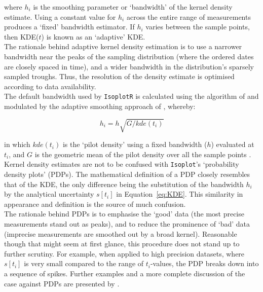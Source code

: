 \documentclass{article}
\begin{document}
\noindent where $h_i$ is the smoothing parameter or `bandwidth' of the
kernel density estimate. Using a constant value for $h_i$ across the
entire range of measurements produces a `fixed' bandwidth estimator.
If $h_i$ varies between the sample points, then KDE($t$) is known as
an `adaptive' KDE.\\

The rationale behind adaptive kernel density estimation is to use a
narrower bandwidth near the peaks of the sampling distribution (where
the ordered dates are closely spaced in time), and a wider bandwidth
in the distribution's sparsely sampled troughs. Thus, the resolution
of the density estimate is optimised according to data
availability.\\

The default bandwidth used by \texttt{IsoplotR} is calculated using
the algorithm of \citet{botev2010} and modulated by the adaptive
smoothing approach of \citet{abramson1982}, whereby:

\begin{equation*}
  h_i = h \sqrt{G/kde(t_i)}
  \label{eq:Abramson}
\end{equation*}

\noindent in which $kde(t_i)$ is the `pilot density' using a fixed
bandwidth ($h$) evaluated at $t_i$, and $G$ is the geometric mean of
the pilot density over all the sample points \citep{kerm2003}.\\

Kernel density estimates are not to be confused with
\texttt{Isoplot}'s `probability density plots' (PDPs). The
mathematical definition of a PDP closely resembles that of the KDE,
the only difference being the substitution of the bandwidth $h_i$ by
the analytical uncertainty $s[t_i]$ in Equation~\ref{eq:KDE}. This
similarity in appearance and definition is the source of much
confusion.\\

The rationale behind PDPs is to emphasise the `good' data (the most
precise measurements stand out as peaks), and to reduce the prominence
of `bad' data (imprecise measurements are smoothed out by a broad
kernel). Reasonable though that might seem at first glance, this
procedure does not stand up to further scrutiny. For example, when
applied to high precision datasets, where $s[t_i]$ is very small
compared to the range of $t_i$-values, the PDP breaks down into a
sequence of spikes. Further examples and a more complete discussion of
the case against PDPs are presented by \citet{vermeesch2012b,
  vermeesch2018b}.\\
\end{document}
